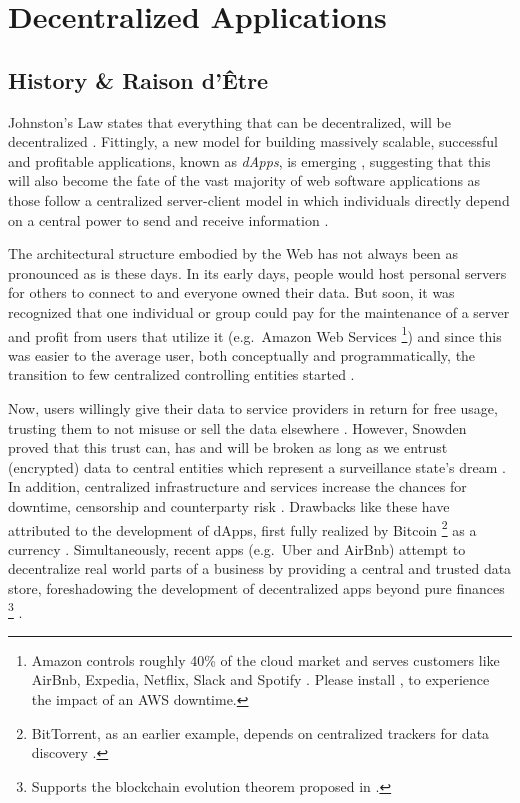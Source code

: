 
\pagebreak

\section{Decentralized Applications}

\subsection{History \& Raison d'Être}
\label{dAppHistory}
Johnston's Law states that everything that can be decentralized, will be decentralized \cite{JohnstonsLaw}. Fittingly, a new model for building massively scalable, successful and profitable applications, known as \textit{\acp{dApp}}, is emerging \cite[p.~5]{Raval.2016} \cite[pp.~1--2]{Johnston2015}, suggesting that this will also become the fate of the vast majority of web software applications as those follow a centralized server-client model in which individuals directly depend on a central power to send and receive information \cite[pp.~7--8]{Raval.2016}. 

The architectural structure embodied by the Web has not always been as pronounced as is these days. In its early days, people would host personal servers for others to connect to and everyone owned their data. But soon, it was recognized that one individual or group could pay for the maintenance of a server and profit from users that utilize it (e.g.~Amazon Web Services \footnote{Amazon controls roughly 40\% of the cloud market and serves customers like AirBnb, Expedia, Netflix, Slack and Spotify \cite{Verge2018}. Please install \cite{fuckOffAWS}, to experience the impact of an AWS downtime.}) and since this was easier to the average user, both conceptually and programmatically, the transition to few centralized controlling entities started \cite[pp.~14]{Raval.2016}. 

Now, users willingly give their data to service providers in return for free usage, trusting them to not misuse or sell the data elsewhere \cite[p.~24]{Raval.2016}. However, Snowden proved that this trust can, has and will be broken as long as we entrust (encrypted) data to central entities which represent a surveillance state's dream \cite{Guardian2013} \cite[p.~25]{Raval.2016}. In addition, centralized infrastructure and services increase the chances for downtime, censorship and \gls{counterparty risk} \cite[p.~23]{Antonopoulos.2018}. Drawbacks like these have attributed to the development of \acp{dApp}, first fully realized by Bitcoin \footnote{BitTorrent, as an earlier example, depends on centralized trackers for data discovery \cite[p.~26]{Raval.2016}.} as a currency \cite[p.~1]{Johnston2015} \cite[p.~1]{bitcoin}. Simultaneously, recent apps (e.g.~Uber and AirBnb) attempt to decentralize real world parts of a business by providing a central and trusted data store, foreshadowing the development of decentralized apps beyond pure finances \footnote{Supports the blockchain evolution theorem proposed in \cite{Swan.2015}.} \cite[p.~15]{Raval.2016}.

